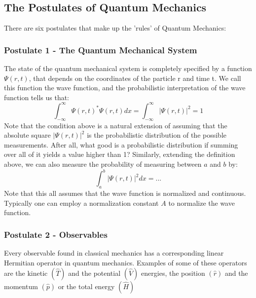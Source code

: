 \documentclass[12pt]{article}
\begin{document}
{\subsection{The Postulates of Quantum Mechanics}
There are six postulates that make up the 'rules' of Quantum Mechanics:
\subsubsection*{Postulate 1 - The Quantum Mechanical System}
The state of the quantum mechanical system is completely specified by a function $\Psi(r, t)$, that depends on the coordinates of the particle r and time t. \newline
We call this function the wave function, and the probabilistic interpretation of the wave function tells us that:
\begin{equation*}
    \int_{-\infty}^\infty \Psi(r, t)^* \Psi(r, t) d x= \int_{-\infty}^\infty | \Psi(r, t) |^2 = 1
\end{equation*}
\newline Note that the condition above is a natural extension of assuming that the absolute square $|\Psi(r, t)|^2$ is the probabilistic distribution of the possible measurements. After all, what good is a probabilistic distribution if summing over all of it yields a value higher than 1? Similarly, extending the definition above, we can also measure the probability of measuring between $a$ and $b$ by:
\begin{equation*}
     \int_{a}^b | \Psi(r, t) |^2 dx = ...
\end{equation*}
\newline Note that this all assumes that the wave function is normalized and continuous. Typically one can employ a normalization constant $A$ to normalize the wave function.
\subsubsection*{Postulate 2 - Observables}
Every observable found in classical mechanics has a corresponding linear Hermitian operator in quantum mechanics. Examples of some of these operators are the kinetic $(\hat T)$ and the potential $(\hat V)$ energies, the position $(\hat r)$ and the momentum $(\hat p)$ or the total energy $(\hat H)$
\newpage
}
\end{document}
